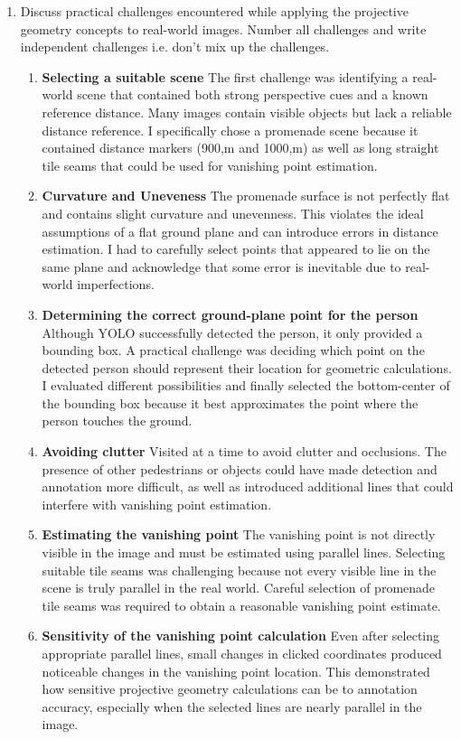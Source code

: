 \begin{enumerate}
  
\item Discuss practical challenges encountered while applying the projective
geometry concepts to real-world images. Number all challenges and write independent challenges i.e. don't mix up the challenges.
\begin{studentSpace}
    \begin{enumerate}
        \item \textbf{Selecting a suitable scene} The first challenge was identifying a real-world scene that contained both strong perspective cues and a known reference distance. Many images contain visible objects but lack a reliable distance reference. I specifically chose a promenade scene because it contained distance markers (900,m and 1000,m) as well as long straight tile seams that could be used for vanishing point estimation.
        \item \textbf{Curvature and Uneveness} The promenade surface is not perfectly flat and contains slight curvature and unevenness. This violates the ideal assumptions of a flat ground plane and can introduce errors in distance estimation. I had to carefully select points that appeared to lie on the same plane and acknowledge that some error is inevitable due to real-world imperfections.
        \item \textbf{Determining the correct ground-plane point for the person} Although YOLO successfully detected the person, it only provided a bounding box. A practical challenge was deciding which point on the detected person should represent their location for geometric calculations. I evaluated different possibilities and finally selected the bottom-center of the bounding box because it best approximates the point where the person touches the ground.
        \item \textbf{Avoiding clutter} Visited at a time to avoid clutter and occlusions. The presence of other pedestrians or objects could have made detection and annotation more difficult, as well as introduced additional lines that could interfere with vanishing point estimation.
        \item \textbf{Estimating the vanishing point} The vanishing point is not directly visible in the image and must be estimated using parallel lines. Selecting suitable tile seams was challenging because not every visible line in the scene is truly parallel in the real world. Careful selection of promenade tile seams was required to obtain a reasonable vanishing point estimate.
        \item \textbf{Sensitivity of the vanishing point calculation} Even after selecting appropriate parallel lines, small changes in clicked coordinates produced noticeable changes in the vanishing point location. This demonstrated how sensitive projective geometry calculations can be to annotation accuracy, especially when the selected lines are nearly parallel in the image.

\end{enumerate}
\end{studentSpace}
\end{enumerate}
